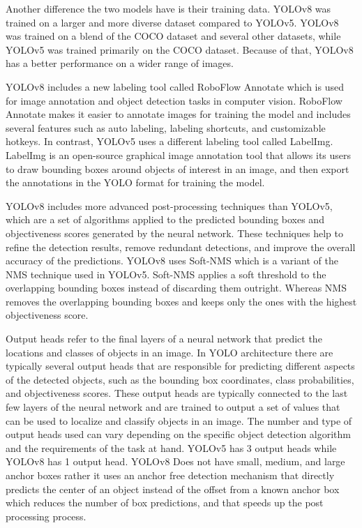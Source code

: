 \documentclass[10pt,twocolumn,letterpaper]{article}
\begin{document}
Another difference the two models have is their training data. YOLOv8 was trained on a larger and more diverse dataset compared to YOLOv5. YOLOv8 was trained on a blend of the COCO dataset and several other datasets, while YOLOv5 was trained primarily on the COCO dataset. Because of that, YOLOv8 has a better performance on a wider range of images.

YOLOv8 includes a new labeling tool called RoboFlow Annotate which is used for image annotation and object detection tasks in computer vision. RoboFlow Annotate makes it easier to annotate images for training the model and includes several features such as auto labeling, labeling shortcuts, and customizable hotkeys. In contrast, YOLOv5 uses a different labeling tool called LabelImg. LabelImg is an open-source graphical image annotation tool that allows its users to draw bounding boxes around objects of interest in an image, and then export the annotations in the YOLO format for training the model.

YOLOv8 includes more advanced post-processing techniques than YOLOv5, which are a set of algorithms applied to the predicted bounding boxes and objectiveness scores generated by the neural network. These techniques help to refine the detection results, remove redundant detections, and improve the overall accuracy of the predictions. YOLOv8 uses Soft-NMS which is a variant of the NMS technique used in YOLOv5. Soft-NMS applies a soft threshold to the overlapping bounding boxes instead of discarding them outright. Whereas NMS removes the overlapping bounding boxes and keeps only the ones with the highest objectiveness score.

Output heads refer to the final layers of a neural network that predict the locations and classes of objects in an image. In YOLO architecture there are typically several output heads that are responsible for predicting different aspects of the detected objects, such as the bounding box coordinates, class probabilities, and objectiveness scores. These output heads are typically connected to the last few layers of the neural network and are trained to output a set of values that can be used to localize and classify objects in an image. The number and type of output heads used can vary depending on the specific object detection algorithm and the requirements of the task at hand. YOLOv5 has 3 output heads while YOLOv8 has 1 output head. YOLOv8 Does not have small, medium, and large anchor boxes rather it uses an anchor free detection mechanism that directly predicts the center of an object instead of the offset from a known anchor box which reduces the number of box predictions, and that speeds up the post processing process.
\end{document}
